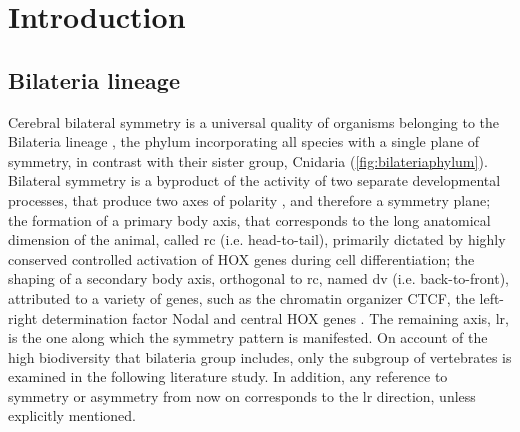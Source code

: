 \chapter{Introduction}
\label{chap:introduction}

\section{Bilateria lineage}
Cerebral bilateral symmetry is a universal quality of organisms belonging to the Bilateria lineage \cite{Concha2012,Corballis2009}, the phylum incorporating all species with a single plane of symmetry, in contrast with their sister group, Cnidaria (\autoref{fig:bilateriaphylum}). Bilateral symmetry is a byproduct of the activity of two separate developmental processes, that produce two axes of polarity \cite{Finnerty2003}, and therefore a symmetry plane; the formation of a primary body axis, that corresponds to the long anatomical dimension of the animal, called \acf{rc} (i.e. head-to-tail), primarily dictated by highly conserved controlled activation of HOX genes during cell differentiation; the shaping of a secondary body axis, orthogonal to \ac{rc}, named \acf{dv} (i.e. back-to-front), attributed to a variety of genes,  such as the chromatin organizer CTCF, the left-right determination factor Nodal and central HOX genes \cite{Heger2020}. The remaining axis, \acf{lr}, is the one along which the symmetry pattern is manifested. On account of the high biodiversity that bilateria group includes, only the subgroup of vertebrates is examined in the following literature study. In addition, any reference to symmetry or asymmetry from now on corresponds to the \ac{lr} direction, unless explicitly mentioned.


